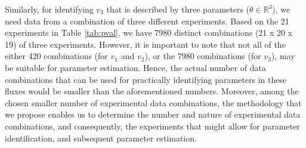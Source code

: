 \documentclass[10pt]{article}
\begin{document}
Similarly, for identifying $v_3$ that is described by three parameters ($\theta \in \mathbb{R}^3$), we need data from a combination of three different experiments. Based on the 21 experiments in Table \ref{tab:pval}, we have 7980 distinct combinations (21 x 20 x 19) of three experiments. However, it is important to note that not all of the either 420 combinations (for $v_1$ and $v_2$), or the 7980 combinations (for $v_3$), may be suitable for parameter estimation. Hence, the actual number of data combinations that can be used for practically identifying parameters in these fluxes would be smaller than the aforementioned numbers. Moreover, among the chosen smaller number of experimental data combinations, the methodology that we propose enables us to determine the number and nature of experimental data combinations, and consequently, the experiments that might allow for parameter identification, and subsequent parameter estimation.

\printbibliography
\end{document}
